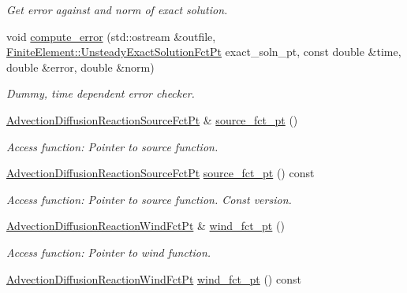 \begin{DoxyCompactItemize}
\begin{DoxyCompactList}\small\item\em Get error against and norm of exact solution. \end{DoxyCompactList}\item 
void \hyperlink{classoomph_1_1AdvectionDiffusionReactionEquations_a4a177abea269ae6063013fe5b3d25ac3}{compute\+\_\+error} (std\+::ostream \&outfile, \hyperlink{classoomph_1_1FiniteElement_ad4ecf2b61b158a4b4d351a60d23c633e}{Finite\+Element\+::\+Unsteady\+Exact\+Solution\+Fct\+Pt} exact\+\_\+soln\+\_\+pt, const double \&time, double \&error, double \&norm)
\begin{DoxyCompactList}\small\item\em Dummy, time dependent error checker. \end{DoxyCompactList}\item 
\hyperlink{classoomph_1_1AdvectionDiffusionReactionEquations_a3443e579e62414ecc50595403982e686}{Advection\+Diffusion\+Reaction\+Source\+Fct\+Pt} \& \hyperlink{classoomph_1_1AdvectionDiffusionReactionEquations_acf51066b96a5406d5ef7dd88c0b7393d}{source\+\_\+fct\+\_\+pt} ()
\begin{DoxyCompactList}\small\item\em Access function\+: Pointer to source function. \end{DoxyCompactList}\item 
\hyperlink{classoomph_1_1AdvectionDiffusionReactionEquations_a3443e579e62414ecc50595403982e686}{Advection\+Diffusion\+Reaction\+Source\+Fct\+Pt} \hyperlink{classoomph_1_1AdvectionDiffusionReactionEquations_a6daf73f5f943bf4ec674b796fe4c36d2}{source\+\_\+fct\+\_\+pt} () const
\begin{DoxyCompactList}\small\item\em Access function\+: Pointer to source function. Const version. \end{DoxyCompactList}\item 
\hyperlink{classoomph_1_1AdvectionDiffusionReactionEquations_a2fff621b5b44c64bd5b3f0412201055f}{Advection\+Diffusion\+Reaction\+Wind\+Fct\+Pt} \& \hyperlink{classoomph_1_1AdvectionDiffusionReactionEquations_a68cbfaf5625359cee3b97d82929feaf9}{wind\+\_\+fct\+\_\+pt} ()
\begin{DoxyCompactList}\small\item\em Access function\+: Pointer to wind function. \end{DoxyCompactList}\item 
\hyperlink{classoomph_1_1AdvectionDiffusionReactionEquations_a2fff621b5b44c64bd5b3f0412201055f}{Advection\+Diffusion\+Reaction\+Wind\+Fct\+Pt} \hyperlink{classoomph_1_1AdvectionDiffusionReactionEquations_a17fba6f4ed57ff9908e4fb3d55aaf5c9}{wind\+\_\+fct\+\_\+pt} () const

\end{DoxyCompactItemize}
